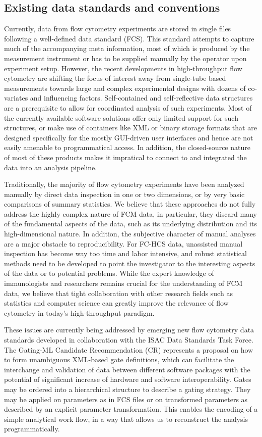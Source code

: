\documentclass[12pt]{article}
\begin{document}
\subsection*{Existing data standards and conventions}
Currently, data from flow cytometry experiments are stored in single
files following a well-defined data standard (FCS). This standard
attempts to capture much of the accompanying meta information, most of
which is produced by the measurement instrument or has to be supplied
manually by the operator upon experiment setup. However, the recent
developments in high-throughput flow cytometry are shifting the focus
of interest away from single-tube based measurements towards large and
complex experimental designs with dozens of co-variates and
influencing factors. Self-contained and self-reflective data
structures are a prerequisite to allow for coordinated analysis of
such experiments. Most of the currently available software solutions
offer only limited support for such structures, or make use of
containers like XML or binary storage formats that are designed
specifically for the mostly GUI-driven user interfaces and hence are
not easily amenable to programmatical access. In addition, the
closed-source nature of most of these products makes it impratical to
connect to and integrated the data into an analysis pipeline.

Traditionally, the majority of flow cytometry experiments have been
analyzed manually by direct data inspection in one or two dimensions,
or by very basic comparisons of summary statistics. We believe that
these approaches do not fully address the highly complex nature of FCM
data, in particular, they discard many of the fundamental aspects of
the data, such as its underlying distribution and its high-dimensional
nature. In addition, the subjective character of manual analyses are a
major obstacle to reproducibility. For FC-HCS data, unassisted manual
inspection has become way too time and labor intensive, and robust
statistical methods need to be developed to point the investigator to
the interesting aspects of the data or to potential problems. While
the expert knowledge of immunologists and researchers remains crucial
for the understanding of FCM data, we believe that tight collaboration
with other research fields such as statistics and computer science can
greatly improve the relevance of flow cytometry in today's
high-throughput paradigm.

These issues are currently being addressed by emerging new flow
cytometry data standards developed in collaboration with the ISAC Data
Standards Task Force.  The Gating-ML Candidate Recommendation (CR)
represents a proposal on how to form unambiguous XML-based gate
definitions, which can facilitate the interchange and validation of
data between different software packages with the potential of
significant increase of hardware and software interoperability. Gates
may be ordered into a hierarchical structure to describe a gating
strategy. They may be applied on parameters as in FCS files or on
transformed parameters as described by an explicit parameter
transformation. This enables the encoding of a simple analytical work
flow, in a way that allows us to reconstruct the analysis
programmatically.
\end{document}
